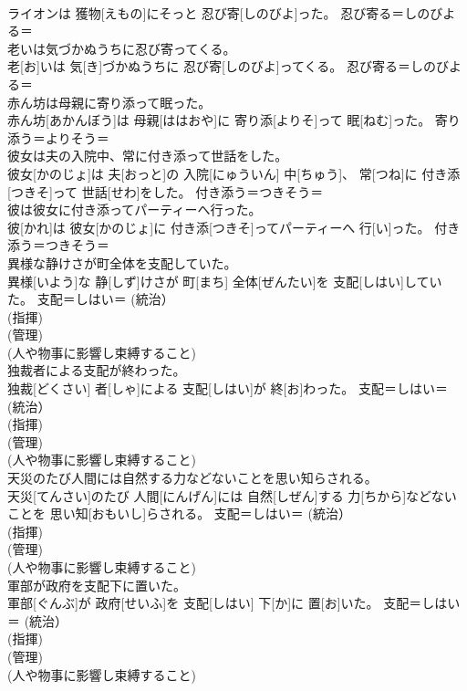 \documentclass[8pt]{extreport}
\begin{document}
\begin{CJK}{UTF8}{min}
{\\	ライオンは 獲物[えもの]にそっと 忍び寄[しのびよ]った。	忍び寄る＝しのびよる＝ 
\\	老いは気づかぬうちに忍び寄ってくる。	
\\	老[お]いは 気[き]づかぬうちに 忍び寄[しのびよ]ってくる。	忍び寄る＝しのびよる＝ 
\\	赤ん坊は母親に寄り添って眠った。	
\\	赤ん坊[あかんぼう]は 母親[ははおや]に 寄り添[よりそ]って 眠[ねむ]った。	寄り添う＝よりそう＝ 
\\	彼女は夫の入院中、常に付き添って世話をした。	
\\	彼女[かのじょ]は 夫[おっと]の 入院[にゅういん] 中[ちゅう]、 常[つね]に 付き添[つきそ]って 世話[せわ]をした。	付き添う＝つきそう＝ 
\\	彼は彼女に付き添ってパーティーへ行った。	
\\	彼[かれ]は 彼女[かのじょ]に 付き添[つきそ]ってパーティーへ 行[い]った。	付き添う＝つきそう＝ 
\\	異様な静けさが町全体を支配していた。	
\\	異様[いよう]な 静[しず]けさが 町[まち] 全体[ぜんたい]を 支配[しはい]していた。	支配＝しはい＝ (統治） 
\\	(指揮) 
\\	(管理) 
\\	(人や物事に影響し束縛すること) 
\\	独裁者による支配が終わった。	
\\	独裁[どくさい] 者[しゃ]による 支配[しはい]が 終[お]わった。	支配＝しはい＝ (統治） 
\\	(指揮) 
\\	(管理) 
\\	(人や物事に影響し束縛すること) 
\\	天災のたび人間には自然する力などないことを思い知らされる。	
\\	天災[てんさい]のたび 人間[にんげん]には 自然[しぜん]する 力[ちから]などないことを 思い知[おもいし]らされる。	支配＝しはい＝ (統治） 
\\	(指揮) 
\\	(管理) 
\\	(人や物事に影響し束縛すること) 
\\	軍部が政府を支配下に置いた。	
\\	軍部[ぐんぶ]が 政府[せいふ]を 支配[しはい] 下[か]に 置[お]いた。	支配＝しはい＝ (統治） 
\\	(指揮) 
\\	(管理) 
\\	(人や物事に影響し束縛すること) 
}
\end{CJK}
\end{document}

